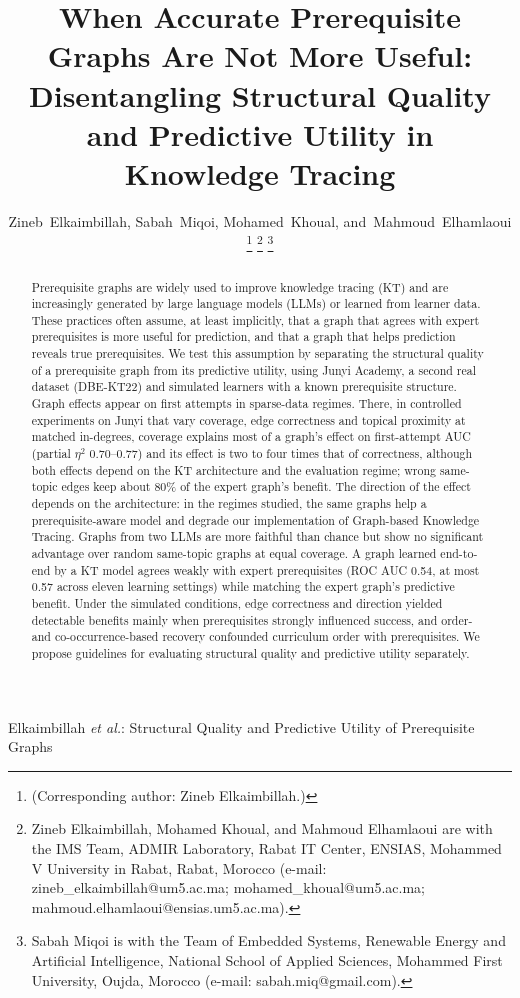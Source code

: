 \documentclass[lettersize,journal]{IEEEtran}
\begin{document}
\title{When Accurate Prerequisite Graphs Are Not More Useful: Disentangling Structural Quality and Predictive Utility in Knowledge Tracing}

\author{Zineb~Elkaimbillah,
        Sabah~Miqoi,
        Mohamed~Khoual,
        and~Mahmoud~Elhamlaoui%
\thanks{(Corresponding author: Zineb Elkaimbillah.)}%
\thanks{Zineb Elkaimbillah, Mohamed Khoual, and Mahmoud Elhamlaoui are with the IMS Team, ADMIR Laboratory, Rabat IT Center, ENSIAS, Mohammed V University in Rabat, Rabat, Morocco (e-mail: zineb\_elkaimbillah@um5.ac.ma; mohamed\_khoual@um5.ac.ma; mahmoud.elhamlaoui@ensias.um5.ac.ma).}%
\thanks{Sabah Miqoi is with the Team of Embedded Systems, Renewable Energy and Artificial Intelligence, National School of Applied Sciences, Mohammed First University, Oujda, Morocco (e-mail: sabah.miq@gmail.com).}}

%
{Elkaimbillah \MakeLowercase{\textit{et al.}}: Structural Quality and Predictive Utility of Prerequisite Graphs}

\maketitle

\begin{abstract}
Prerequisite graphs are widely used to improve knowledge tracing (KT) and are increasingly generated by large language models (LLMs) or learned from learner data. These practices often assume, at least implicitly, that a graph that agrees with expert prerequisites is more useful for prediction, and that a graph that helps prediction reveals true prerequisites. We test this assumption by separating the structural quality of a prerequisite graph from its predictive utility, using Junyi Academy, a second real dataset (DBE-KT22) and simulated learners with a known prerequisite structure. Graph effects appear on first attempts in sparse-data regimes. There, in controlled experiments on Junyi that vary coverage, edge correctness and topical proximity at matched in-degrees, coverage explains most of a graph's effect on first-attempt AUC (partial $\eta^2$ 0.70--0.77) and its effect is two to four times that of correctness, although both effects depend on the KT architecture and the evaluation regime; wrong same-topic edges keep about 80\% of the expert graph's benefit. The direction of the effect depends on the architecture: in the regimes studied, the same graphs help a prerequisite-aware model and degrade our implementation of Graph-based Knowledge Tracing. Graphs from two LLMs are more faithful than chance but show no significant advantage over random same-topic graphs at equal coverage. A graph learned end-to-end by a KT model agrees weakly with expert prerequisites (ROC AUC 0.54, at most 0.57 across eleven learning settings) while matching the expert graph's predictive benefit. Under the simulated conditions, edge correctness and direction yielded detectable benefits mainly when prerequisites strongly influenced success, and order- and co-occurrence-based recovery confounded curriculum order with prerequisites. We propose guidelines for evaluating structural quality and predictive utility separately.
\end{abstract}
\end{document}
